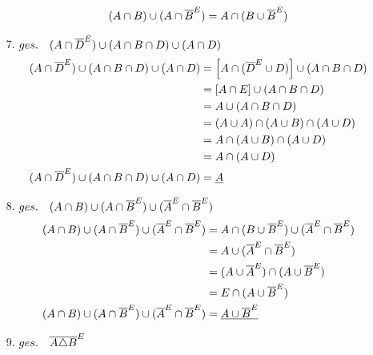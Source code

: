 \begin{itemize}
                        \begin{align*}
                            (A \cap B) \cup (A \cap \overline{B}^E) & = A \cap (B \cup \overline{B}^E) \\
                        \end{align*}
                    \item[7.] $ges.\quad (A \cap \overline{D}^E) \cup (A \cap B \cap D) \cup (A \cap D)$  
                        \begin{align*}
                            (A \cap \overline{D}^E) \cup (A \cap B \cap D) \cup (A \cap D) & = \Big[ A \cap (\overline{D}^E \cup D)\Big] \cup (A \cap B \cap D)\\
                            & = [A \cap E] \cup (A \cap B \cap D) \\
                            & = A \cup (A \cap B \cap D) \\
                            & = (A \cup A) \cap (A \cup B) \cap (A \cup D) \\
                            & = A \cap (A \cup B) \cap (A \cup D) \\
                            & = A \cap (A \cup D) \\
                            (A \cap \overline{D}^E) \cup (A \cap B \cap D) \cup (A \cap D) & = \underline{A} \\
                        \end{align*}
                    \item[8.] $ges.\quad (A \cap B) \cup (A \cap \overline{B}^E) \cup (\overline{A}^E \cap \overline{B}^E)$  
                        \begin{align*}
                            (A \cap B) \cup (A \cap \overline{B}^E) \cup (\overline{A}^E \cap \overline{B}^E) & = A \cap (B \cup \overline{B}^E) \cup (\overline{A}^E \cap \overline{B}^E) \\
                            & = A \cup (\overline{A}^E \cap \overline{B}^E) \\
                            & = (A \cup \overline{A}^E) \cap (A \cup \overline{B}^E) \\
                            & = E \cap (A \cup \overline{B}^E) \\
                            (A \cap B) \cup (A \cap \overline{B}^E) \cup (\overline{A}^E \cap \overline{B}^E) & = \underline{A \cup \overline{B}^E} \\
                        \end{align*}
                    \item[9.] $ges.\quad \overline{A \triangle B}^E$  

\end{itemize}

